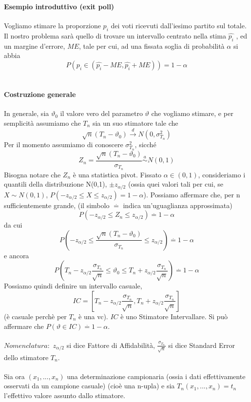 \noindent \textbf{Esempio introduttivo (exit poll)}
\\ \\
Vogliamo stimare la proporzione $p_i$ dei voti ricevuti dall'iesimo partito sul totale. Il nostro problema sarà quello di trovare un intervallo centrato nella stima $\hat{p_i}$ , ed un margine d'errore, $ME$, tale per cui, ad una fissata soglia di probabilità $\alpha$ si abbia $$P(p_i \in (\hat{p_i} - ME,\hat{p_i} + ME))=1 - \alpha$$
\\ \\
\noindent\textbf{Costruzione generale}
\\ \\
In generale, sia $\vartheta_0$ il valore vero del parametro $\vartheta$ che vogliamo stimare, e per semplicità assumiamo che $T_n$ sia un suo stimatore tale che 
$$\sqrt{n}(T_n - \vartheta_0)\stackrel{d}{\rightarrow}N(0,\sigma_{T_n}^2)$$
Per il momento assumiamo di conoscere $\sigma_{T_n}^2$, sicché
$$Z_n=\frac{\sqrt{n}(T_n - \vartheta_0)}{\sigma_{T_n}} \stackrel{a}{\sim}N(0,1)$$ Bisogna notare che $Z_n$ è una statistica pivot.
Fissato $\alpha \in (0,1)$, consideriamo i quantili della distribuzione N(0,1), $\pm z_{\alpha / 2}$ (ossia quei valori tali per cui, se $X \sim N(0,1)$, $P(-z_{\alpha / 2} \leq X \leq z_{\alpha / 2})=1-\alpha$). Possiamo affermare che, per n sufficientemente grande, (il simbolo $\stackrel{.}{=}$ indica un'uguaglianza approssimata) $$P(-z_{\alpha / 2} \leq Z_n \leq z_{\alpha / 2})\stackrel{.}{=}1-\alpha$$ da cui
$$P(-z_{\alpha / 2} \leq \frac{\sqrt{n}(T_n - \vartheta_0)}{\sigma_{T_n}} \leq z_{\alpha / 2})\stackrel{.}{=}1-\alpha $$ e ancora
$$P(T_n - z_{\alpha / 2} \frac{\sigma_{T_n}}{\sqrt{n}} \leq \vartheta_0 \leq T_n+z_{\alpha / 2} \frac{\sigma_{T_n}}{\sqrt{n}})\stackrel{.}{=}1-\alpha$$
Possiamo quindi definire un intervallo casuale, $$IC=\left[T_n - z_{\alpha / 2} \frac{\sigma_{T_n}}{\sqrt{n}},T_n + z_{\alpha / 2} \frac{\sigma_{T_n}}{\sqrt{n}}\right]$$ (è casuale perchè per $T_n$ è una vc). $IC$ è uno Stimatore Intervallare.
Si può affermare che $P(\vartheta \in IC) \stackrel {.}{=} 1 - \alpha$.
\\ \\
\noindent $\textit{Nomenclatura}:$
$z_{\alpha / 2}$ si dice Fattore di Affidabilità,
$\displaystyle\frac{\sigma_{T_n}}{\sqrt{n}}$ si dice Standard Error dello stimatore $T_n$.
\\ \\
Sia ora $(x_1,...,x_n)$ una determinazione campionaria (ossia i dati effettivamente osservati da un campione casuale) (cioè una n-upla) e sia $T_n(x_1,...,x_n)=t_n$ l'effettivo valore assunto dallo stimatore.

